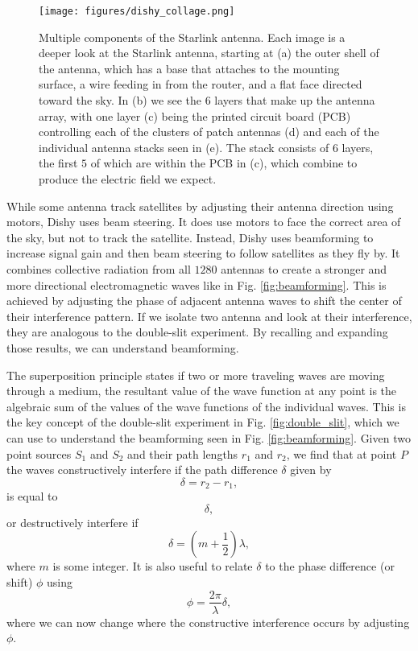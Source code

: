 \documentclass[10pt]{article}
\begin{document}
\begin{figure}[h!]
\centering
\texttt{[image: figures/dishy\_collage.png]}
\caption{Multiple components of the Starlink antenna. Each image is a deeper look at the Starlink antenna, starting at (a) the outer shell of the antenna, which has a base that attaches to the mounting surface, a wire feeding in from the router, and a flat face directed toward the sky. In (b) we see the $6$ layers that make up the antenna array, with one layer (c) being the printed circuit board (PCB) controlling each of the clusters of patch antennas (d) and each of the individual antenna stacks seen in (e). The stack consists of $6$ layers, the first $5$ of which are within the PCB in (c), which combine to produce the electric field we expect\cite{USPTO_report}\cite{How_does_Starlink_Satellite_Internet_Work}.}
\label{fig:dishy}
\end{figure}

While some antenna track satellites by adjusting their antenna direction using motors, Dishy uses beam steering. It does use motors to face the correct area of the sky, but not to track the satellite. Instead, Dishy uses beamforming to increase signal gain and then beam steering to follow satellites as they fly by. It combines collective radiation from all $1280$ antennas to create a stronger and more directional electromagnetic waves like in Fig. \ref{fig:beamforming}. This is achieved by adjusting the phase of adjacent antenna waves to shift the center of their interference pattern. If we isolate two antenna and look at their interference, they are analogous to the double-slit experiment. By recalling and expanding those results, we can understand beamforming. 

The superposition principle states if two or more traveling waves are moving through a medium, the resultant value of the wave function at any point is the algebraic sum of the values of the wave functions of the individual waves. This is the key concept of the double-slit experiment in Fig. \ref{fig:double_slit}, which we can use to understand the beamforming seen in Fig. \ref{fig:beamforming}. Given two point sources $S_1$ and $S_2$ and their path lengths $r_1$ and $r_2$, we find that at point $P$ the waves constructively interfere if the path difference $\delta$ given by
\begin{equation}
\delta = r_2 - r_1,
    \label{eq:path_diff}
\end{equation}
is equal to
\begin{equation}
\delta ,
    \label{eq:constructive}
\end{equation}
or destructively interfere if
\begin{equation}
\delta = (m+\frac{1}{2})\lambda,
    \label{eq:destructive}
\end{equation}
where $m$ is some integer. It is also useful to relate $\delta$ to the phase difference (or shift) $\phi$ using
\begin{equation}
\phi = \frac{2\pi}{\lambda}\delta,
    \label{eq:phase_shift}
\end{equation}
where we can now change where the constructive interference occurs by adjusting $\phi$. 
\end{document}

